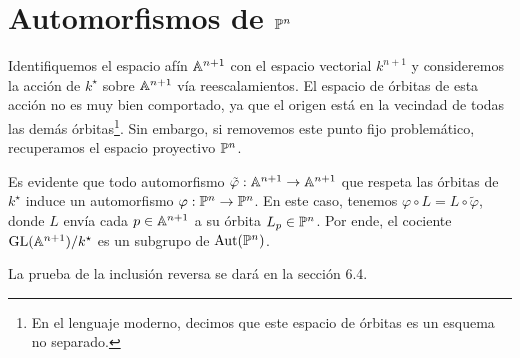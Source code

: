 \section{Automorfismos de $\P^n$}

\noindent Identifiquemos el espacio afín $\A^{n+1}$ con el espacio vectorial $k^{n+1}$ y consideremos la acción de $k^\star$ sobre $\A^{n+1}$ vía reescalamientos. El espacio de órbitas de esta acción no es muy bien comportado, ya que el origen está en la vecindad de todas las demás órbitas\footnote{En el lenguaje moderno, decimos que este espacio de órbitas es un esquema no separado.}. Sin embargo, si removemos este punto fijo problemático, recuperamos el espacio proyectivo $\P^n$.

Es evidente que todo automorfismo $\tilde \varphi : \A^{n+1} \to \A^{n+1}$ que respeta las órbitas de $k^\star$ induce un automorfismo $\varphi : \P^n \to \P^n$. En este caso, tenemos $\varphi \circ L = L \circ \tilde \varphi$, donde $L$ envía cada $p \in \A^{n+1}$ a su órbita $L_p \in \P^n$. Por ende, el cociente $\GL(\A^{n+1}) / k^\star$ es un subgrupo de $\Aut(\P^n)$.

La prueba de la inclusión reversa se dará en la sección 6.4.

